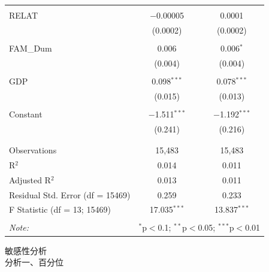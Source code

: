 \documentclass[a4paper,14pt]{article}\usepackage[]{graphicx}\usepackage[]{color}
\begin{document}
\begin{table}[!htbp]
\begin{tabular}{@{\extracolsep{5pt}}lcc}
  & & \\ 
 RELAT & $-$0.00005 & 0.0001 \\ 
  & (0.0002) & (0.0002) \\ 
  & & \\ 
 FAM\_Dum & 0.006 & 0.006$^{*}$ \\ 
  & (0.004) & (0.004) \\ 
  & & \\ 
 GDP & 0.098$^{***}$ & 0.078$^{***}$ \\ 
  & (0.015) & (0.013) \\ 
  & & \\ 
 Constant & $-$1.511$^{***}$ & $-$1.192$^{***}$ \\ 
  & (0.241) & (0.216) \\ 
  & & \\ 
\hline \\[-1.8ex] 
Observations & 15,483 & 15,483 \\ 
R$^{2}$ & 0.014 & 0.011 \\ 
Adjusted R$^{2}$ & 0.013 & 0.011 \\ 
Residual Std. Error (df = 15469) & 0.259 & 0.233 \\ 
F Statistic (df = 13; 15469) & 17.035$^{***}$ & 13.837$^{***}$ \\ 
\hline 
\hline \\[-1.8ex] 
\textit{Note:}  & \multicolumn{2}{r}{$^{*}$p$<$0.1; $^{**}$p$<$0.05; $^{***}$p$<$0.01} \\ 
\end{tabular} 
\end{table} 


\newpage
敏感性分析\\
分析一、百分位\\
\end{document}
